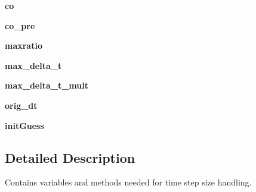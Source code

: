 \begin{DoxyCompactItemize}
\item 
\hypertarget{classmain__src_1_1courant_1_1Courant_a798c6155bcbe1d25343452da6d92214b}{{\bfseries co}}\label{classmain__src_1_1courant_1_1Courant_a798c6155bcbe1d25343452da6d92214b}

\item 
\hypertarget{classmain__src_1_1courant_1_1Courant_ab9799e7e1ae9ee2290750a4856c085cd}{{\bfseries co\-\_\-pre}}\label{classmain__src_1_1courant_1_1Courant_ab9799e7e1ae9ee2290750a4856c085cd}

\item 
\hypertarget{classmain__src_1_1courant_1_1Courant_a1577574cdc0ca8800e3bedb9e81042e6}{{\bfseries maxratio}}\label{classmain__src_1_1courant_1_1Courant_a1577574cdc0ca8800e3bedb9e81042e6}

\item 
\hypertarget{classmain__src_1_1courant_1_1Courant_a361e63da22e9007971d0698cca1826b0}{{\bfseries max\-\_\-delta\-\_\-t}}\label{classmain__src_1_1courant_1_1Courant_a361e63da22e9007971d0698cca1826b0}

\item 
\hypertarget{classmain__src_1_1courant_1_1Courant_a0d3630532b14b11bb7e5b1ec86138c8c}{{\bfseries max\-\_\-delta\-\_\-t\-\_\-mult}}\label{classmain__src_1_1courant_1_1Courant_a0d3630532b14b11bb7e5b1ec86138c8c}

\item 
\hypertarget{classmain__src_1_1courant_1_1Courant_a7fd02fa74d447d2a4ea81e5c07f7a9e0}{{\bfseries orig\-\_\-dt}}\label{classmain__src_1_1courant_1_1Courant_a7fd02fa74d447d2a4ea81e5c07f7a9e0}

\item 
\hypertarget{classmain__src_1_1courant_1_1Courant_a3d9339fe9d90c3eb28ae04ef2ce25801}{{\bfseries init\-Guess}}\label{classmain__src_1_1courant_1_1Courant_a3d9339fe9d90c3eb28ae04ef2ce25801}

\end{DoxyCompactItemize}


\subsection{Detailed Description}
Contains variables and methods needed for time step size handling. 



